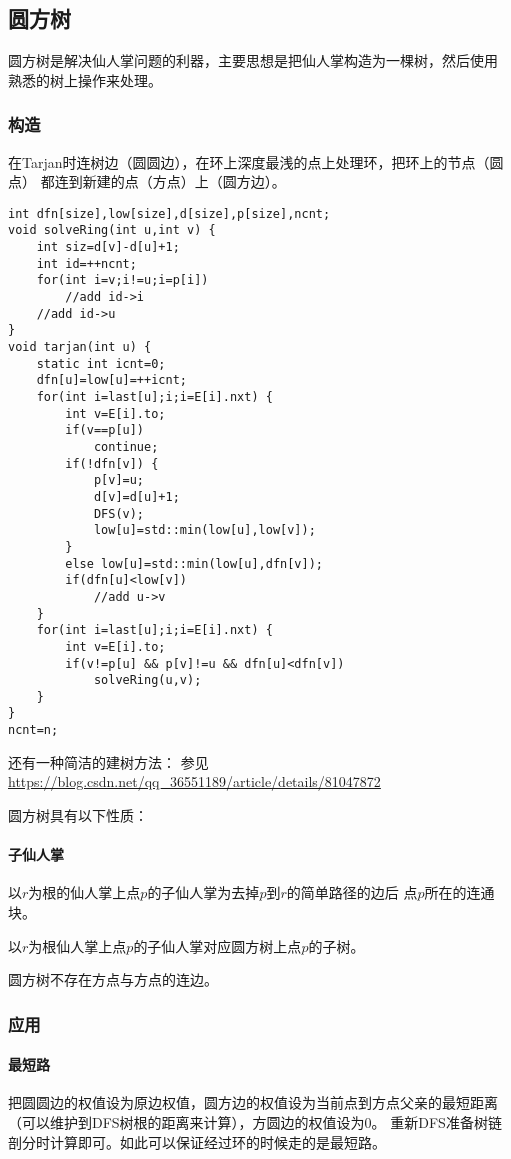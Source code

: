 \subsection{圆方树}
圆方树是解决仙人掌问题的利器，主要思想是把仙人掌构造为一棵树，然后使用
熟悉的树上操作来处理。
\subsubsection{构造}
在Tarjan时连树边（圆圆边），在环上深度最浅的点上处理环，把环上的节点（圆点）
都连到新建的点（方点）上（圆方边）。

\begin{lstlisting}
int dfn[size],low[size],d[size],p[size],ncnt;
void solveRing(int u,int v) {
    int siz=d[v]-d[u]+1;
    int id=++ncnt;
    for(int i=v;i!=u;i=p[i])
        //add id->i
    //add id->u
}
void tarjan(int u) {
    static int icnt=0;
    dfn[u]=low[u]=++icnt;
    for(int i=last[u];i;i=E[i].nxt) {
        int v=E[i].to;
        if(v==p[u])
            continue;
        if(!dfn[v]) {
            p[v]=u;
            d[v]=d[u]+1;
            DFS(v);
            low[u]=std::min(low[u],low[v]);
        }
        else low[u]=std::min(low[u],dfn[v]);
        if(dfn[u]<low[v])
            //add u->v
    }
    for(int i=last[u];i;i=E[i].nxt) {
        int v=E[i].to;
        if(v!=p[u] && p[v]!=u && dfn[u]<dfn[v])
            solveRing(u,v);
    }
}
ncnt=n;
\end{lstlisting}

还有一种简洁的建树方法：
参见\url{https://blog.csdn.net/qq\_36551189/article/details/81047872}

圆方树具有以下性质：
\paragraph{子仙人掌} 以$r$为根的仙人掌上点$p$的子仙人掌为去掉$p$到$r$的简单路径的边后
点$p$所在的连通块。
\begin{property}
    以$r$为根仙人掌上点$p$的子仙人掌对应圆方树上点$p$的子树。
\end{property}
\begin{property}
    圆方树不存在方点与方点的连边。
\end{property}

\subsubsection{应用}
\paragraph{最短路}
把圆圆边的权值设为原边权值，圆方边的权值设为当前点到方点父亲的最短距离
（可以维护到DFS树根的距离来计算），方圆边的权值设为0。
重新DFS准备树链剖分时计算即可。如此可以保证经过环的时候走的是最短路。

